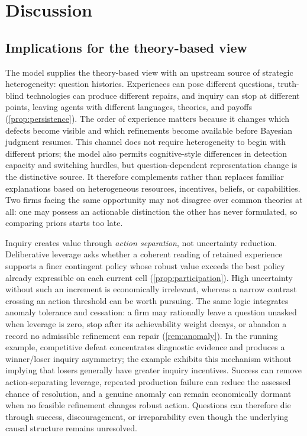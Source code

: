 \documentclass[11pt]{article}
\theoremstyle{definition}
\begin{document}
\section{Discussion}
\label{sec:discussion}

\subsection{Implications for the theory-based view}

The model supplies the theory-based view with an upstream source of strategic heterogeneity: question histories.
Experiences can pose different questions, truth-blind technologies can produce different repairs, and inquiry can stop at different points, leaving agents with different languages, theories, and payoffs (\cref{prop:persistence}).
The order of experience matters because it changes which defects become visible and which refinements become available before Bayesian judgment resumes.
This channel does not require heterogeneity to begin with different priors; the model also permits cognitive-style differences in detection capacity and switching hurdles, but question-dependent representation change is the distinctive source.
It therefore complements rather than replaces familiar explanations based on heterogeneous resources, incentives, beliefs, or capabilities.
Two firms facing the same opportunity may not disagree over common theories at all: one may possess an actionable distinction the other has never formulated, so comparing priors starts too late.

Inquiry creates value through \emph{action separation}, not uncertainty reduction.
Deliberative leverage asks whether a coherent reading of retained experience supports a finer contingent policy whose robust value exceeds the best policy already expressible on each current cell (\cref{prop:participation}).
High uncertainty without such an increment is economically irrelevant, whereas a narrow contrast crossing an action threshold can be worth pursuing.
The same logic integrates anomaly tolerance and cessation: a firm may rationally leave a question unasked when leverage is zero, stop after its achievability weight decays, or abandon a record no admissible refinement can repair (\cref{rem:anomaly}).
In the running example, competitive defeat concentrates diagnostic evidence and produces a winner/loser inquiry asymmetry; the example exhibits this mechanism without implying that losers generally have greater inquiry incentives.
Success can remove action-separating leverage, repeated production failure can reduce the assessed chance of resolution, and a genuine anomaly can remain economically dormant when no feasible refinement changes robust action.
Questions can therefore die through success, discouragement, or irreparability even though the underlying causal structure remains unresolved.
\end{document}
